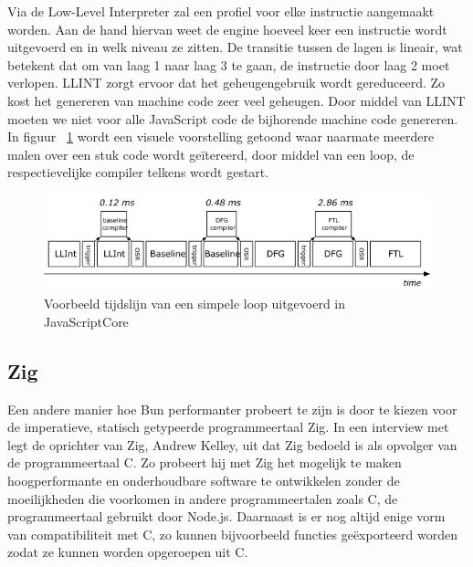 Via de Low-Level Interpreter zal een profiel voor elke instructie aangemaakt worden. 
Aan de hand hiervan weet de engine hoeveel keer een instructie wordt uitgevoerd en in welk niveau ze zitten.
De transitie tussen de lagen is lineair, wat betekent dat om van laag 1 naar laag 3 te gaan, de instructie door laag 2 moet verlopen.
LLINT zorgt ervoor dat het geheugengebruik wordt gereduceerd. Zo kost het genereren van machine code zeer veel geheugen.
Door middel van LLINT moeten we niet voor alle JavaScript code de bijhorende machine code genereren.
In figuur ~\ref{fig:JavaScriptcore} wordt een visuele voorstelling getoond 
waar naarmate meerdere malen over een stuk code wordt geïtereerd, door middel van een loop, de respectievelijke compiler telkens wordt gestart.
\begin{figure}[H]
    \centering
    \includegraphics[width=.9\textwidth]{graphics/javascriptcore.png}
    \caption{\label{fig:JavaScriptcore}Voorbeeld tijdslijn van een simpele loop uitgevoerd in JavaScriptCore ~\autocite{Pizlo2020}}
\end{figure}

\subsection{Zig}
Een andere manier hoe Bun performanter probeert te zijn is door te kiezen voor de imperatieve, statisch getypeerde programmeertaal Zig. 
In een interview met ~\textcite{Motroc2017} legt de oprichter van Zig, Andrew Kelley, uit dat Zig bedoeld is als opvolger van de programmeertaal C.
Zo probeert hij met Zig het mogelijk te maken hoogperformante en onderhoudbare software te ontwikkelen 
zonder de moeilijkheden die voorkomen in andere programmeertalen zoals C, de programmeertaal gebruikt door Node.js.
Daarnaast is er nog altijd enige vorm van compatibiliteit met C, 
zo kunnen bijvoorbeeld functies geëxporteerd  worden zodat ze kunnen worden opgeroepen uit C.

